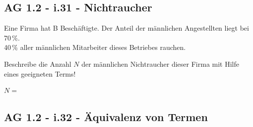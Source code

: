 \documentclass[a4paper,12pt]{article}
\begin{document}

\newpage

\smallskip\begin{minipage}{1\textwidth}
\subsection{AG 1.2 - i.31 - Nichtraucher}\smallskip

\end{minipage}

\begin{beispiel}[AG 1.2]{1}
Eine Firma hat B Beschäftigte. Der Anteil der männlichen Angestellten liegt bei 70\,\%.\\
40\,\% aller männlichen Mitarbeiter dieses Betriebes rauchen.

Beschreibe die Anzahl $N$ der männlichen Nichtraucher dieser Firma mit Hilfe eines geeigneten Terms!\leer

$N=$\,
\end{beispiel}


\newpage

\smallskip\begin{minipage}{1\textwidth}
\subsection{AG 1.2 - i.32 - Äquivalenz von Termen}\smallskip

\end{minipage}
\end{document}
